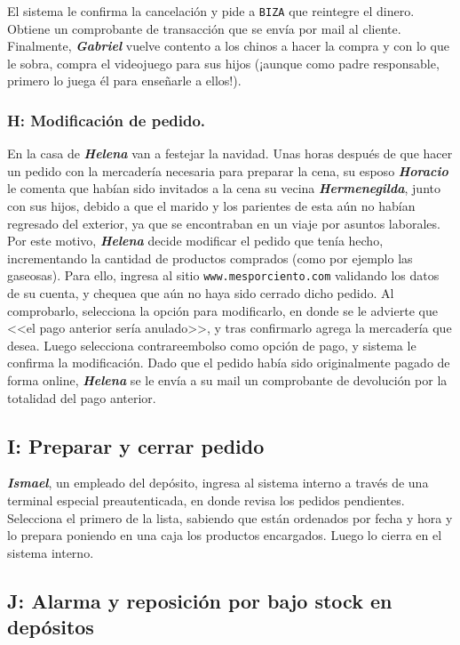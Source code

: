 El sistema le confirma la cancelación y pide a \texttt{BIZA} que reintegre el
dinero. Obtiene un comprobante de transacción que se envía por mail al
cliente. Finalmente, \textbf{\emph{Gabriel}} vuelve contento a los chinos a
hacer la compra y con lo que le sobra, compra el videojuego para sus hijos
(¡aunque como padre responsable, primero lo juega él para enseñarle a ellos!).

\subsubsection{H: Modificación de pedido.}

En la casa de \textbf{\emph{Helena}} van a festejar la navidad. Unas horas
después de que hacer un pedido con la mercadería necesaria para preparar la
cena, su esposo \textbf{\emph{Horacio}} le comenta que habían sido invitados a
la cena su vecina \textbf{\emph{Hermenegilda}}, junto con sus hijos, debido a
que el marido y los parientes de esta aún no habían regresado del exterior, ya
que se encontraban en un viaje por asuntos laborales. Por este motivo,
\textbf{\emph{Helena}} decide modificar el pedido que tenía hecho,
incrementando la cantidad de productos comprados (como por ejemplo las
gaseosas). Para ello, ingresa al sitio \texttt{www.mesporciento.com} validando
los datos de su cuenta, y chequea que aún no haya sido cerrado dicho pedido.
Al comprobarlo, selecciona la opción para modificarlo, en donde se le advierte
que <<el pago anterior sería anulado>>, y tras confirmarlo agrega la
mercadería que desea. Luego selecciona contrareembolso como opción de pago, y
sistema le confirma la modificación. Dado que el pedido había sido
originalmente pagado de forma online, \textbf{\emph{Helena}} se le envía a su
mail un comprobante de devolución por la totalidad del pago anterior.

\subsection{I: Preparar y cerrar pedido}

\textbf{\emph{Ismael}}, un empleado del depósito, ingresa al sistema interno a
través de una terminal especial preautenticada, en donde revisa los pedidos
pendientes. Selecciona el primero de la lista, sabiendo que están ordenados por fecha y hora
y lo prepara poniendo en una caja los productos encargados. Luego lo cierra en
el sistema interno.

\subsection{J: Alarma y reposición por bajo stock en depósitos}

